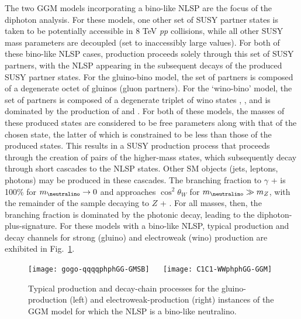 The two %
GGM models incorporating a bino-like NLSP
are the focus of the diphoton analysis. For these models,
one other set of SUSY partner states is taken to be potentially
accessible in 8 TeV {\it pp} collisions, while
all other SUSY mass parameters are decoupled (set to
inaccessibly large values). For both %
of these bino-like NLSP cases, production
proceeds solely through this set of SUSY partners,
with the NLSP appearing in the subsequent
decays of the produced SUSY partner states. For the gluino-bino
model, the set of partners is composed of a degenerate octet of
gluinos (gluon partners).
For the `wino-bino' model, the set of partners is composed
of a degenerate triplet of wino states
\neutralinotwo, \chargino, and is dominated by the production
of \chiplus\chiminus and \neutralinotwo\chargino.
For both %
of these models, the masses of these produced states
are considered to be free parameters along with that of the chosen
\neutralino state, the latter of which is constrained to be less
than those of the produced states.
This results in a SUSY production
process that proceeds through the creation of pairs of the higher-mass
states, which subsequently decay through
short cascades to the NLSP \neutralino states. Other SM
objects (jets, leptons, photons) may be produced in these cascades.
The \neutralino branching fraction
to $\gamma$ + \gravitino is 100\% for $m_{\neutralino} \to 0$ and
approaches $\cos^2 \theta_W$ for $m_{\neutralino} \gg m_Z$, with
the remainder of the \neutralino sample decaying to $Z$ + \gravitino.
For all \neutralino masses, then, the branching fraction is dominated
by the photonic decay, leading to the diphoton-plus-\met signature.
For these models with a bino-like NLSP, typical production and decay channels for strong (gluino) and
electroweak (wino) production are exhibited in Fig.~\ref{fig:feynman_bino}.

\begin{figure}[tp]
  \begin{center}
    \texttt{[image: gogo-qqqqphphGG-GMSB]} ~~
    \texttt{[image: C1C1-WWphphGG-GGM]}
  \end{center}
  \caption{
Typical production and decay-chain processes for the gluino-production (left)
      and electroweak-production (right) instances of the
      GGM model for which the NLSP is a bino-like neutralino.
    \label{fig:feynman_bino}
  }
\end{figure}

